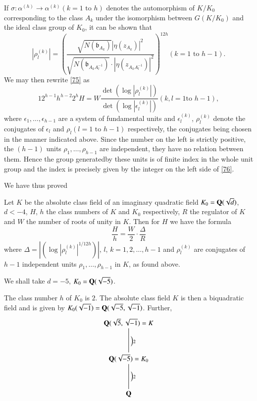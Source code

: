 If $\sigma:\alpha^{(h)}\to \alpha^{(k)}(k=1\text{ to } h)$ denotes the
automorphism of $K/K_{0}$ corresponding to the class $A_{k}$ under the
isomorphism between $G(K/K_{0})$ and the ideal class group of $K_{0}$,
it can be shown that
$$
|\rho^{(k)}_{l}|=\left(\frac{\sqrt{N(\mathfrak{b}_{A_{k}})}|\eta(z_{A_{k}})|^{2}}{\sqrt{N(\mathfrak{b}_{A_{k}A^{-1}_{l}})}\cdot
  |\eta(z_{A_{k}A^{-1}_{l}})|^{2}}\right)^{12h}(k=1\text{ to } h-1).
$$
We may then rewrite \eqref{75} as
\begin{equation*}
12^{h-1}h^{h-2}2^{h}H=W\frac{\det(\log|\rho^{(k)}_{l}|)}{\det(\log|\epsilon^{(k)}_{l}|)}(k,l=1\text{
  to } h-1),\tag{76}\label{76} 
\end{equation*}
where $\epsilon_{1},\ldots,\epsilon_{h-1}$ are a system of fundamental
units and $\epsilon^{(k)}_{l}$, $\rho^{(k)}_{l}$ denote the conjugates
of $\epsilon_{l}$ and $\rho_{l}(l=1\text{ to } h-1)$ respectively, the
conjugates being chosen in the manner indicated above. Since the
number on the left is strictly positive, the $(h-1)$ units
$\rho_{1},\ldots,\rho_{h-1}$ are independent, \ie they have no
relation between them. Hence the group generated\pageoriginale by
these units is of finite index in the whole unit group and the index
is precisely given by the integer on the left side of \eqref{76}.

We have thus proved

\begin{thm}\label{thm7}
Let $K$ be the absolute class field of an imaginary quadratic field
$K_{0}=\mathbf{Q}(\sqrt{d})$, $d<-4$, $H$, $h$ the class numbers of $K$ and
$K_{0}$ respectively, $R$ the regulator of $K$ and $W$ the number of
roots of unity in $K$. Then for $H$ we have the formula
$$
\frac{H}{h}=\frac{W}{2}\cdot \frac{\Delta}{R}
$$
where $\Delta=|(\log|\rho^{(k)}_{l}|^{1/12h})|$, $l$,
$k=1,2,\ldots,h-1$ and $\rho^{(k)}_{l}$ are conjugates of $h-1$
independent units $\rho_{1},\ldots,\rho_{h-1}$ in $K$, as found above.
\end{thm}

\begin{example*}
We shall take $d=-5$, \ie $K_{0}=\mathbf{Q}(\sqrt{-5})$.

The class number $h$ of $K_{0}$ is $2$. The absolute class field $K$
is then a biquadratic field and is given by
$K_{0}(\sqrt{-1})=\mathbf{Q}(\sqrt{-5},\sqrt{-1})$. Further,
\[
\xymatrix@R=1.2cm{
\bQ(\sqrt{5},\sqrt{-1})=K\ar@{-}[d]^{\Big)2}\\
\bQ(\sqrt{-5})=K_{0}\ar@{-}[d]^{\Big)2}\\
\bQ
}
\]
\end{example*}

